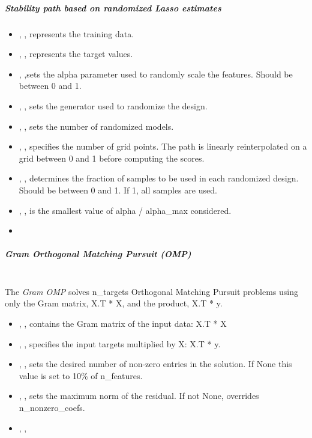 \subparagraph{Stability path based on randomized Lasso estimates}
\mbox{}
\begin{itemize}
  \item {}, , represents the training data.
  \item {}, , represents the
  target values.
  \item {}, ,sets the alpha
  parameter used to randomly scale the
  features.
  Should be between 0 and 1.
  \item {}, , sets the generator used to randomize the
  design.
  \item {}, , sets the number of
  randomized models.
  \item {}, , specifies the number of grid
  points.
  The path is linearly reinterpolated on a grid between 0 and 1 before computing
  the scores.
  \item {}, , determines the
  fraction of samples to be used in each randomized design.
  Should be between 0 and 1.
  If 1, all samples are used.
  \item {}, , is the smallest value of
  alpha / alpha\_max considered.
  \item \verDescriptionB{}
\end{itemize}

\subparagraph{Gram Orthogonal Matching Pursuit (OMP)}
\mbox{}
\\The \textit{Gram OMP} solves n\_targets Orthogonal Matching Pursuit problems
using only the Gram matrix, X.T * X, and the product, X.T * y.
%
\begin{itemize}
  \item {}, ,
  contains the Gram matrix of the input data: X.T * X
  \item {}, , specifies the input targets multiplied by X:
  X.T * y.
  \item {}, , sets the desired number of
  non-zero entries in the solution.
  If None this value is set to 10\% of n\_features.
  \item {}, , sets the maximum norm of the residual.
  If not None, overrides n\_nonzero\_coefs.
  \item {}, ,
\end{itemize}

